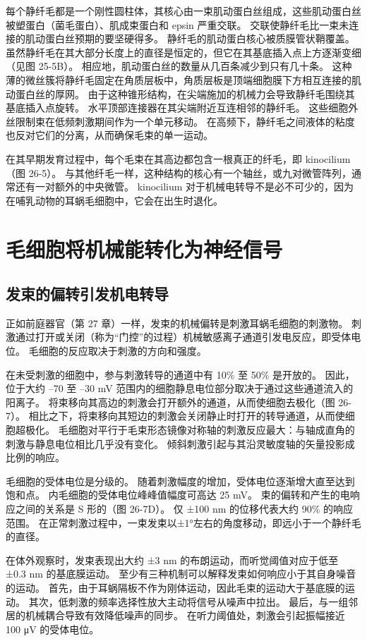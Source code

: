 每个静纤毛都是一个刚性圆柱体，其核心由一束肌动蛋白丝组成，这些肌动蛋白丝被塑蛋白（菌毛蛋白）、肌成束蛋白和 epsin 严重交联。 交联使静纤毛比一束未连接的肌动蛋白丝预期的要坚硬得多。 静纤毛的肌动蛋白核心被质膜管状鞘覆盖。 虽然静纤毛在其大部分长度上的直径是恒定的，但它在其基底插入点上方逐渐变细（见图 25-5B）。 相应地，肌动蛋白丝的数量从几百条减少到只有几十条。 这种薄的微丝簇将静纤毛固定在角质层板中，角质层板是顶端细胞膜下方相互连接的肌动蛋白丝的厚网。 由于这种锥形结构，在尖端施加的机械力会导致静纤毛围绕其基底插入点旋转。 水平顶部连接器在其尖端附近互连相邻的静纤毛。 这些细胞外丝限制束在低频刺激期间作为一个单元移动。 在高频下，静纤毛之间液体的粘度也反对它们的分离，从而确保毛束的单一运动。

在其早期发育过程中，每个毛束在其高边都包含一根真正的纤毛，即 kinocilium（图 26-5）。 与其他纤毛一样，这种结构的核心有一个轴丝，或九对微管阵列，通常还有一对额外的中央微管。 kinocilium 对于机械电转导不是必不可少的，因为在哺乳动物的耳蜗毛细胞中，它会在出生时退化。


\section{毛细胞将机械能转化为神经信号}


\subsection{发束的偏转引发机电转导}
正如前庭器官（第 27 章）一样，发束的机械偏转是刺激耳蜗毛细胞的刺激物。 刺激通过打开或关闭（称为“门控”的过程）机械敏感离子通道引发电反应，即受体电位。 毛细胞的反应取决于刺激的方向和强度。

在未受刺激的细胞中，参与刺激转导的通道中有 10\% 至 50\% 是开放的。 因此，位于大约 –70 至 –30 mV 范围内的细胞静息电位部分取决于通过这些通道流入的阳离子。 将束移向其高边的刺激会打开额外的通道，从而使细胞去极化（图 26-7）。 相比之下，将束移向其短边的刺激会关闭静止时打开的转导通道，从而使细胞超极化。 毛细胞对平行于毛束形态镜像对称轴的刺激反应最大：与轴成直角的刺激与静息电位相比几乎没有变化。 倾斜刺激引起与其沿灵敏度轴的矢量投影成比例的响应。

毛细胞的受体电位是分级的。 随着刺激幅度的增加，受体电位逐渐增大直至达到饱和点。 内毛细胞的受体电位峰峰值幅度可高达 25 mV。 束的偏转和产生的电响应之间的关系是 S 形的（图 26-7D）。 仅 ±100 nm 的位移代表大约 90\% 的响应范围。 在正常刺激过程中，一束发束以±1°左右的角度移动，即远小于一个静纤毛的直径。

在体外观察时，发束表现出大约 ±3 nm 的布朗运动，而听觉阈值对应于低至 ±0.3 nm 的基底膜运动。 至少有三种机制可以解释发束如何响应小于其自身噪音的运动。 首先，由于耳蜗隔板不作为刚体运动，因此毛束的运动大于基底膜的运动。 其次，低刺激的频率选择性放大主动将信号从噪声中拉出。 最后，与一组邻居的机械耦合导致有效降低噪声的同步。 在听力阈值处，刺激会引起振幅接近 100 μV 的受体电位。

